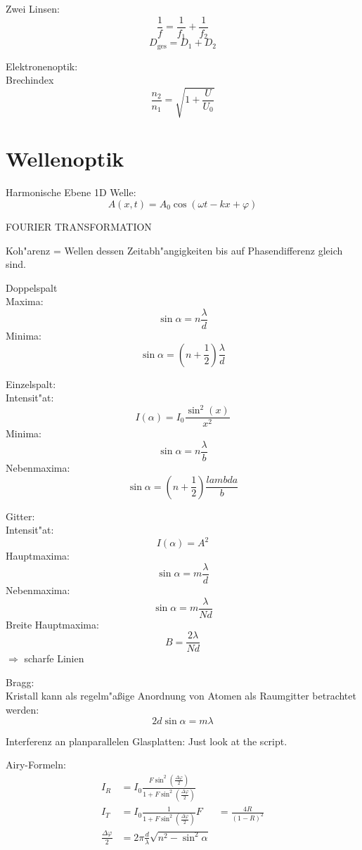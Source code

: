 \documentclass[12pt]{report}
\newcommand{\vphi}{\varphi}
\begin{document}
Zwei Linsen:
\[\frac{1}{f}=\frac{1}{f_1}+\frac{1}{f_2}\]
\[D_\mathrm{ges}=D_1+D_2\]

Elektronenoptik:\\
Brechindex
\[\frac{n_2}{n_1}=\sqrt{1+\frac{U}{U_0}}\]

\section{Wellenoptik}

Harmonische Ebene 1D Welle:
\[A(x,t)=A_0\cos(\omega t-kx+\vphi)\]

FOURIER TRANSFORMATION

Koh"arenz = Wellen dessen Zeitabh"angigkeiten bis auf Phasendifferenz gleich sind.

Doppelspalt\\
Maxima: \[\sin\alpha=n\frac{\lambda}{d}\]
Minima: \[\sin\alpha=\left(n+\frac{1}{2}\right)\frac{\lambda}{d}\]

Einzelspalt:\\
Intensit"at: \[I(\alpha)=I_0\frac{\sin^2(x)}{x^2}\]
Minima: \[\sin\alpha=n\frac{\lambda}{b}\]
Nebenmaxima: \[\sin\alpha=\left(n+\frac{1}{2}\right)\frac{lambda}{b}\]

Gitter:\\
Intensit"at: \[I(\alpha)=A^2\]
Hauptmaxima: \[\sin\alpha=m\frac{\lambda}{d}\]
Nebenmaxima: \[\sin\alpha=m\frac{\lambda}{Nd}\]
Breite Hauptmaxima: \[B=\frac{2\lambda}{Nd}\]
$\Rightarrow$ scharfe Linien

Bragg:\\
Kristall kann als regelm"a\ss ige Anordnung von Atomen als Raumgitter betrachtet werden:
\[2d\sin\alpha=m\lambda\]

Interferenz an planparallelen Glasplatten:
Just look at the script.

Airy-Formeln:
\begin{align*}
I_R&=I_0\frac{F\sin^2\left(\frac{\Delta\vphi}{2}\right)}{1+F\sin^2\left(\frac{\Delta\vphi}{2}\right)}\\
I_T&=I_0\frac{1}{1+F\sin^2\left(\frac{\Delta\vphi}{2}\right)}
F&=\frac{4R}{(1-R)^2}\\
\frac{\Delta\vphi}{2}&=2\pi\frac{d}{\lambda}\sqrt{n^2-\sin^2\alpha}
\end{align*}

\end{document}
